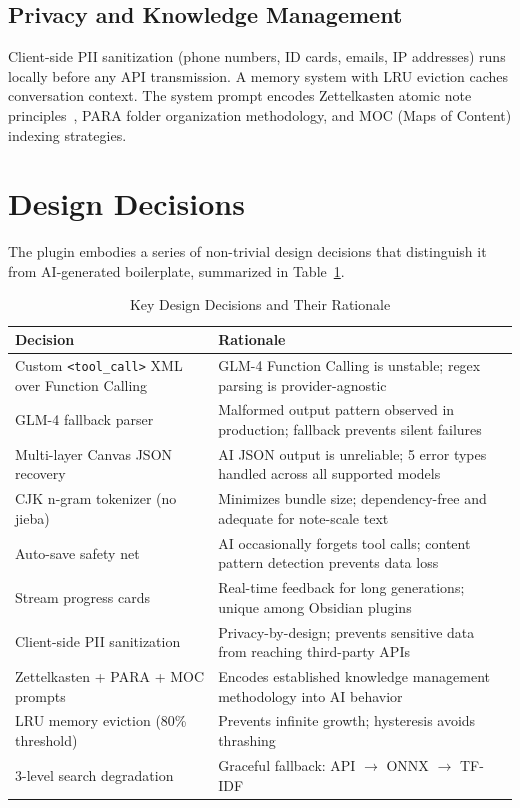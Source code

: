 \documentclass[10pt,a4paper]{article}
\begin{document}
\subsection{Privacy and Knowledge Management}

Client-side PII sanitization (phone numbers, ID cards, emails, IP addresses) runs locally before any API transmission. A memory system with LRU eviction caches conversation context. The system prompt encodes Zettelkasten atomic note principles~\cite{zettelkasten}, PARA folder organization methodology, and MOC (Maps of Content) indexing strategies.

\section{Design Decisions}

The plugin embodies a series of non-trivial design decisions that distinguish it from AI-generated boilerplate, summarized in Table~\ref{tab:decisions}.

\begin{table}[H]
\centering
\caption{Key Design Decisions and Their Rationale}
\label{tab:decisions}
\begin{tabular}{p{3.2cm}p{6.8cm}}
\toprule
\textbf{Decision} & \textbf{Rationale} \\
\midrule
Custom \texttt{<tool\_call>} XML over Function Calling & GLM-4 Function Calling is unstable; regex parsing is provider-agnostic \\
GLM-4 fallback parser & Malformed output pattern observed in production; fallback prevents silent failures \\
Multi-layer Canvas JSON recovery & AI JSON output is unreliable; 5 error types handled across all supported models \\
CJK n-gram tokenizer (no jieba) & Minimizes bundle size; dependency-free and adequate for note-scale text \\
Auto-save safety net & AI occasionally forgets tool calls; content pattern detection prevents data loss \\
Stream progress cards & Real-time feedback for long generations; unique among Obsidian plugins \\
Client-side PII sanitization & Privacy-by-design; prevents sensitive data from reaching third-party APIs \\
Zettelkasten + PARA + MOC prompts & Encodes established knowledge management methodology into AI behavior \\
LRU memory eviction (80\% threshold) & Prevents infinite growth; hysteresis avoids thrashing \\
3-level search degradation & Graceful fallback: API $\rightarrow$ ONNX $\rightarrow$ TF-IDF \\
\bottomrule
\end{tabular}
\end{table}
\end{document}
